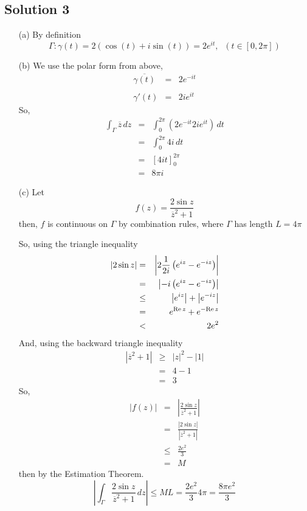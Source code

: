 \subsection*{Solution 3}

\begin{itemize}
\item[(a)]
By definition 
\[ \Gamma: \gamma(t) = 2(\cos(t) + i\sin(t)) = 2e^{it},\;\; (t\in[0,2\pi]) \]

\item[(b)]
We use the polar form from above,
\begin{eqnarray*}
\overline{\gamma(t)}
	&=& 2e^{-it}\\
\\
\gamma'(t)
	&=& 2ie^{it}
\end{eqnarray*}
So,
\begin{eqnarray*}
\int_\Gamma \overline{z}\,dz
	&=& \int_0^{2\pi} \left( 2e^{-it} 2ie^{it} \right) \, dt \\
	&=& \int_0^{2\pi} 4i\,dt \\
	&=& \left[ 4it \right]_0^{2\pi} \\
	&=& 8\pi i
\end{eqnarray*}

\item[(c)]
Let
\[ f(z) = \frac{ 2\sin z }{ \overline{z}^2+1 } \]
then, $f$ is continuous on $\Gamma$ by combination rules, where $\Gamma$
has length $L=4\pi$


So, using the triangle inequality
\begin{eqnarray*}
|2\sin z|
	&=& \left| 2\frac{1}{2i} \left( e^{iz} - e^{-iz} \right) \right| \\
	&=& \left| -i \left( e^{iz} - e^{-iz} \right) \right| \\
	&\le& \left| e^{iz} \right| + \left| e^{-iz} \right| \\
	&=& e^{{\rm Re}\,z} + e^{-{\rm Re}\,z} \\
	&<& 2e^2
\end{eqnarray*}
And, using the backward triangle inequality
\begin{eqnarray*}
\left| \overline{z}^2+1 \right|
	&\ge& \left| z \right|^2 - |1| \\
	&=& 4-1 \\
	&=& 3
\end{eqnarray*}
So,
\begin{eqnarray*}
|f(z)|	&=& \left| \frac{ 2\sin z }{ \overline{z}^2+1 } \right| \\
	&=& \frac{ |2\sin z| }{ \left| \overline{z}^2+1 \right| } \\
	&\le& \frac{2e^2}{3} \\
	&=& M
\end{eqnarray*}
then by the Estimation Theorem.
\[
\left| \int_\Gamma \frac{ 2\sin z }{ \overline{z}^2+1 }\,dz \right|
\le ML = \frac{2e^2}{3} 4\pi = \frac{8\pi e^2}{3} 
\]

\end{itemize}

